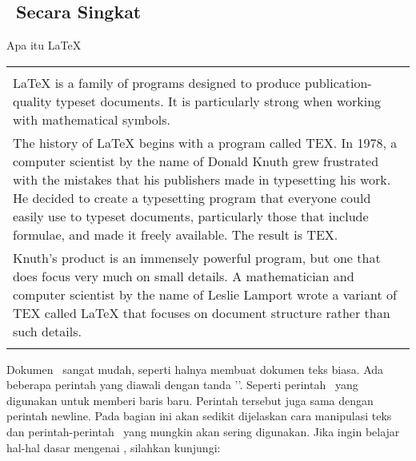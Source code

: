 \chapter{\babDua}

\section{\latex~Secara Singkat}
Apa itu \LaTeX \\
\begin{tabular}{| p{13cm} |}
	\hline 
	\\
	LaTeX is a family of programs designed to produce publication-quality 
	typeset documents. It is particularly strong when working with 
	mathematical symbols. \\	
	The history of LaTeX begins with a program called TEX. In 1978, a 
	computer scientist by the name of Donald Knuth grew frustrated with the 
	mistakes that his publishers made in typesetting his work. He decided 
	to create a typesetting program that everyone could easily use to 
	typeset documents, particularly those that include formulae, and made 
	it freely available. The result is TEX. \\	
	Knuth's product is an immensely powerful program, but one that does 
	focus very much on small details. A mathematician and computer 
	scientist by the name of Leslie Lamport wrote a variant of TEX called 
	LaTeX that focuses on document structure rather than such details. \\
	\\
	\hline
\end{tabular}

\vspace*{0.8cm}

Dokumen \latex~sangat mudah, seperti halnya membuat dokumen teks biasa. Ada 
beberapa perintah yang diawali dengan tanda '\bslash'. 
Seperti perintah \bslash\bslash~yang digunakan untuk memberi baris baru. 
Perintah tersebut juga sama dengan perintah \bslash newline. 
Pada bagian ini akan sedikit dijelaskan cara manipulasi teks dan 
perintah-perintah \latex~yang mungkin akan sering digunakan. 
Jika ingin belajar hal-hal dasar mengenai \latex, silahkan kunjungi: 

